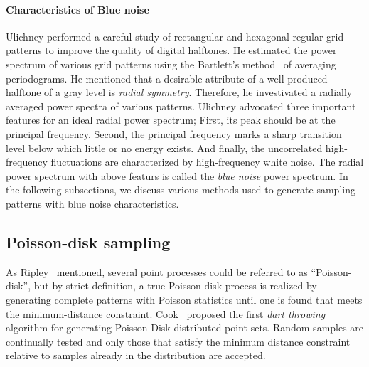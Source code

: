 \paragraph{Characteristics of Blue noise} 
Ulichney performed a careful study of rectangular and hexagonal regular grid patterns to improve the 
quality of digital halftones. He estimated the power spectrum of various grid patterns using the 
Bartlett's method~\cite{bar64b}
of averaging periodograms. He mentioned that a 
desirable attribute of a well-produced halftone of a gray level is \emph{radial symmetry}. Therefore, 
he investivated a radially averaged power spectra of various patterns. 
Ulichney advocated three important features for an ideal radial power spectrum;  
First, its peak should be at the principal frequency. %
Second, the principal frequency marks a sharp transition level below which little or no energy exists. 
And finally, the uncorrelated high-frequency fluctuations are characterized by high-frequency white noise. 
The radial power spectrum with above featurs is called the \emph{blue noise} power spectrum. 
In the following subsections, we discuss various methods used to generate sampling patterns 
with blue noise characteristics.

%
\subsection{Poisson-disk sampling}
As Ripley~\cite{Ripley77} mentioned, several point processes could be referred to as 
``Poisson-disk'', but by strict definition, a true Poisson-disk process is realized by generating complete 
patterns with Poisson statistics until one is found that meets the minimum-distance constraint. 
Cook~\cite{Cook:1986:SSC} proposed the first \emph{dart throwing} 
algorithm for generating Poisson Disk distributed point sets. 
Random samples are continually tested and only those that satisfy the minimum
distance constraint relative to samples already in the distribution
are accepted.

